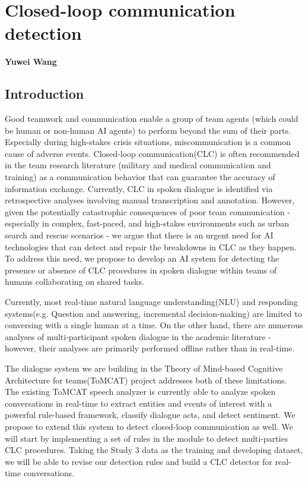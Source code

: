 \chapter{Closed-loop communication detection}
\label{ch:clc}
\textbf{Yuwei Wang}

\section{Introduction}

Good teamwork and communication enable a group of team agents (which could be
human or non-human AI agents) to perform beyond the sum of their
parts\citep{roberts2022state}. Especially during high-stakes crisis situations,
miscommunication is a common cause of adverse
events\citep{taylor2014description,davis2017operative}. Closed-loop
communication(CLC) is often recommended in the team research literature
(military and medical communication and training) as a communication behavior
that can guarantee the accuracy of information
exchange\citep{marzuki2019closed}. Currently, CLC in spoken dialogue is
identified via retrospective analyses involving manual transcription and
annotation. However, given the potentially catastrophic consequences of poor
team communication\citep{flin2004identifying} - especially in complex,
fast-paced, and high-stakes environments such as urban search and rescue
scenarios - we argue that there is an urgent need for AI technologies that can
detect and repair the breakdowns in CLC as they happen. To address this need,
we propose to develop an AI system for detecting the presence or absence of CLC
procedures in spoken dialogue within teams of humans collaborating on shared
tasks.

Currently, most real-time natural language understanding(NLU) and responding
systems(e.g. Question and answering\citep{hawkins2017you}, incremental
decision-making\citep{devault2011detecting}) are limited to conversing with a
single human at a time. On the other hand, there are numerous analyses of
multi-participant spoken dialogue in the academic literature - however, their
analyses are primarily performed offline rather than in real-time. 

The dialogue system we are building in the Theory of Mind-based Cognitive
Architecture for teams(ToMCAT) project addresses both of these limitations. The
existing ToMCAT speech analyzer is currently able to analyze spoken
conversations in real-time to extract entities and events of interest with a
powerful rule-based framework\citep{valenzuela-escarcega-etal-2016-odins},
classify dialogue acts, and detect sentiment. We propose to extend this system
to detect closed-loop communication as well. We will start by implementing a
set of rules in the module to detect multi-parties CLC procedures. Taking the
Study 3 data as the training and developing dataset, we will be able to revise
our detection rules and build a CLC detector for real-time conversations.

